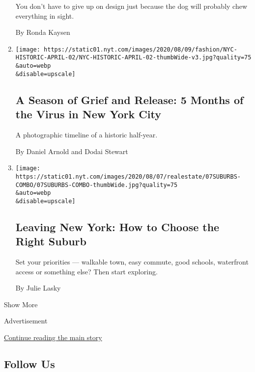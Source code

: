 \begin{enumerate}
  You don't have to give up on design just because the dog will probably
  chew everything in sight.

  By Ronda Kaysen
\item
  \href{/2020/08/07/style/coronavirus-nyc-historic-season.html}{}

  \texttt{[image: https://static01.nyt.com/images/2020/08/09/fashion/NYC-HISTORIC-APRIL-02/NYC-HISTORIC-APRIL-02-thumbWide-v3.jpg?quality=75\\\&auto=webp\\\&disable=upscale]}

  \hypertarget{a-season-of-grief-and-release-5-months-of-the-virus-in-new-york-city-1}{%
  \subsection{A Season of Grief and Release: 5 Months of the Virus in
  New York
  City}\label{a-season-of-grief-and-release-5-months-of-the-virus-in-new-york-city-1}}

  A photographic timeline of a historic half-year.

  By Daniel Arnold and Dodai Stewart
\item
  \href{/2020/08/07/realestate/coronavirus-escape-suburbs-new-york.html}{}

  \texttt{[image: https://static01.nyt.com/images/2020/08/07/realestate/07SUBURBS-COMBO/07SUBURBS-COMBO-thumbWide.jpg?quality=75\\\&auto=webp\\\&disable=upscale]}

  \hypertarget{leaving-new-york-how-to-choose-the-right-suburb}{%
  \subsection{Leaving New York: How to Choose the Right
  Suburb}\label{leaving-new-york-how-to-choose-the-right-suburb}}

  Set your priorities --- walkable town, easy commute, good schools,
  waterfront access or something else? Then start exploring.

  By Julie Lasky
\end{enumerate}

Show More

Advertisement

\protect\hyperlink{after-mid7}{Continue reading the main story}

\hypertarget{follow-us}{%
\subsection{Follow Us}\label{follow-us}}

